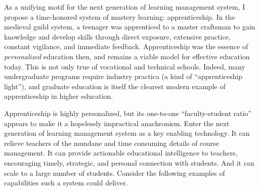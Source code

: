 \documentclass{article}
\begin{document}
As a unifying motif for the next generation of learning management system,
I propose a time-honored system of mastery learning: apprenticeship.
In the medieval guild system,
a teenager was apprenticed to a master craftsman
to gain knowledge and develop skills through
direct exposure,
extensive practice,
constant vigilance,
and immediate feedback.
Apprenticeship was the essence of \emph{personalized} education then,
and remains a viable model for effective education today.
This is not only true of vocational and technical schools.
Indeed, many undergraduate programs require
industry practica (a kind of ``apprenticeship light''),
and graduate education is itself the clearest modern example of apprenticeship
in higher education.

Apprenticeship is highly personalized,
but its one-to-one ``faculty-student ratio''
appears to make it a hopelessly impractical anachronism.
Enter the next generation of learning management system
as a key enabling technology.
It can relieve teachers
of the mundane and time consuming details
of course management.
It can provide actionable educational intelligence to teachers,
encouraging timely, strategic, and personal connection with students.
And it can scale to a large number of students.
Consider the following examples of capabilities such a system could deliver.
\end{document}
